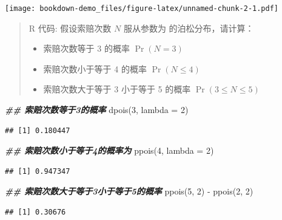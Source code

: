 \documentclass[
]{book}
\newenvironment{Shaded}{\begin{snugshade}}{\end{snugshade}}
\newcommand{\AttributeTok}[1]{\textcolor[rgb]{0.77,0.63,0.00}{#1}}
\newcommand{\DecValTok}[1]{\textcolor[rgb]{0.00,0.00,0.81}{#1}}
\newcommand{\DocumentationTok}[1]{\textcolor[rgb]{0.56,0.35,0.01}{\textbf{\textit{#1}}}}
\newcommand{\FunctionTok}[1]{\textcolor[rgb]{0.00,0.00,0.00}{#1}}
\newcommand{\NormalTok}[1]{#1}
\newcommand{\SpecialCharTok}[1]{\textcolor[rgb]{0.00,0.00,0.00}{#1}}
\begin{document}
\texttt{[image: bookdown-demo\_files/figure-latex/unnamed-chunk-2-1.pdf]}

\begin{quote}
R 代码:
假设索赔次数 \(N\) 服从参数为 的泊松分布，请计算：

\begin{itemize}
\item
  索赔次数等于 3 的概率 \(\Pr(N=3)\)
\item
  索赔次数小于等于 4 的概率 \(\Pr(N\leq4)\)
\item
  索赔次数大于等于 3 小于等于 5 的概率 \(\Pr(3\leq N \leq 5)\)
\end{itemize}
\end{quote}

\begin{Shaded}
\begin{Highlighting}[]
\DocumentationTok{\#\# 索赔次数等于3的概率}
\FunctionTok{dpois}\NormalTok{(}\DecValTok{3}\NormalTok{, }\AttributeTok{lambda =} \DecValTok{2}\NormalTok{)}
\end{Highlighting}
\end{Shaded}

\begin{verbatim}
## [1] 0.180447
\end{verbatim}

\begin{Shaded}
\begin{Highlighting}[]
\DocumentationTok{\#\# 索赔次数小于等于4的概率为}
\FunctionTok{ppois}\NormalTok{(}\DecValTok{4}\NormalTok{, }\AttributeTok{lambda =} \DecValTok{2}\NormalTok{)}
\end{Highlighting}
\end{Shaded}

\begin{verbatim}
## [1] 0.947347
\end{verbatim}

\begin{Shaded}
\begin{Highlighting}[]
\DocumentationTok{\#\# 索赔次数大于等于3小于等于5的概率}
\FunctionTok{ppois}\NormalTok{(}\DecValTok{5}\NormalTok{, }\DecValTok{2}\NormalTok{) }\SpecialCharTok{{-}} \FunctionTok{ppois}\NormalTok{(}\DecValTok{2}\NormalTok{, }\DecValTok{2}\NormalTok{)}
\end{Highlighting}
\end{Shaded}

\begin{verbatim}
## [1] 0.30676
\end{verbatim}
\end{document}
